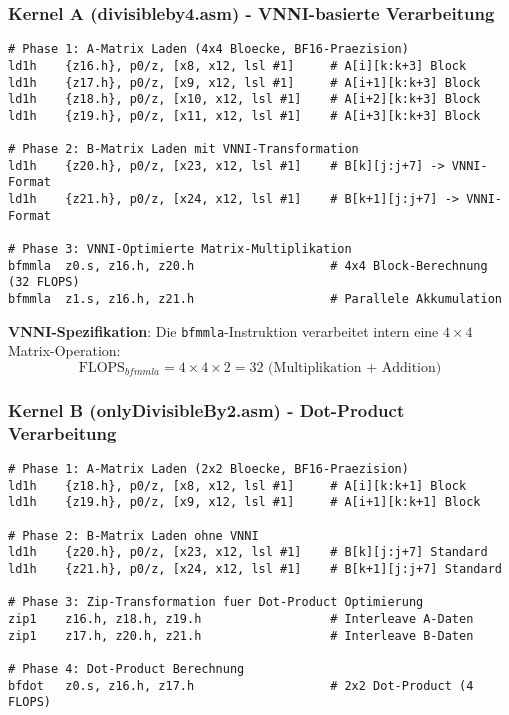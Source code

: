 \documentclass[11pt,a4paper]{article}
\begin{document}
\subsubsection{Kernel A (divisibleby4.asm) - VNNI-basierte Verarbeitung}

\begin{lstlisting}[language={}, caption={Kernel A: Datenlade- und Vorverarbeitungssequenz}]
# Phase 1: A-Matrix Laden (4x4 Bloecke, BF16-Praezision)
ld1h    {z16.h}, p0/z, [x8, x12, lsl #1]     # A[i][k:k+3] Block
ld1h    {z17.h}, p0/z, [x9, x12, lsl #1]     # A[i+1][k:k+3] Block  
ld1h    {z18.h}, p0/z, [x10, x12, lsl #1]    # A[i+2][k:k+3] Block
ld1h    {z19.h}, p0/z, [x11, x12, lsl #1]    # A[i+3][k:k+3] Block

# Phase 2: B-Matrix Laden mit VNNI-Transformation
ld1h    {z20.h}, p0/z, [x23, x12, lsl #1]    # B[k][j:j+7] -> VNNI-Format
ld1h    {z21.h}, p0/z, [x24, x12, lsl #1]    # B[k+1][j:j+7] -> VNNI-Format

# Phase 3: VNNI-Optimierte Matrix-Multiplikation
bfmmla  z0.s, z16.h, z20.h                   # 4x4 Block-Berechnung (32 FLOPS)
bfmmla  z1.s, z16.h, z21.h                   # Parallele Akkumulation
\end{lstlisting}

\textbf{VNNI-Spezifikation}: Die \texttt{bfmmla}-Instruktion verarbeitet intern eine $4 \times 4$ Matrix-Operation:
\begin{equation}
\text{FLOPS}_{bfmmla} = 4 \times 4 \times 2 = 32 \text{ (Multiplikation + Addition)}
\end{equation}

\subsubsection{Kernel B (onlyDivisibleBy2.asm) - Dot-Product Verarbeitung}

\begin{lstlisting}[language={}, caption={Kernel B: Datenlade- und Vorverarbeitungssequenz}]
# Phase 1: A-Matrix Laden (2x2 Bloecke, BF16-Praezision)
ld1h    {z18.h}, p0/z, [x8, x12, lsl #1]     # A[i][k:k+1] Block
ld1h    {z19.h}, p0/z, [x9, x12, lsl #1]     # A[i+1][k:k+1] Block

# Phase 2: B-Matrix Laden ohne VNNI
ld1h    {z20.h}, p0/z, [x23, x12, lsl #1]    # B[k][j:j+7] Standard
ld1h    {z21.h}, p0/z, [x24, x12, lsl #1]    # B[k+1][j:j+7] Standard

# Phase 3: Zip-Transformation fuer Dot-Product Optimierung
zip1    z16.h, z18.h, z19.h                  # Interleave A-Daten
zip1    z17.h, z20.h, z21.h                  # Interleave B-Daten

# Phase 4: Dot-Product Berechnung
bfdot   z0.s, z16.h, z17.h                   # 2x2 Dot-Product (4 FLOPS)
\end{lstlisting}
\end{document}

